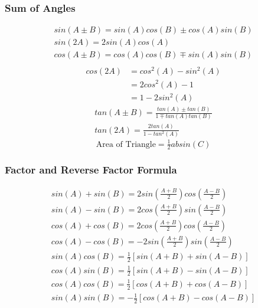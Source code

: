 \documentclass[../main]{subfiles}
\begin{document}
	\subsubsection{Sum of Angles}
	\begin{equation*} \begin{gathered}
		sin(A \pm B) = sin(A)cos(B) \pm cos(A)sin(B) \\
		sin(2A) = 2sin(A)cos(A) \\
		cos(A \pm B) = cos(A)cos(B) \mp sin(A)sin(B) \\
	\end{gathered} \end{equation*}
	\begin{equation*} \begin{split}
		cos(2A) & = cos^2(A) - sin^2(A) \\
				& = 2cos^2(A) - 1 \\
				& = 1 - 2sin^2(A)
	\end{split} \end{equation*}
	\begin{equation*} \begin{gathered}
		tan(A \pm B) = \frac{tan(A) \pm tan(B)}{1 \mp tan(A)tan(B)} \\
		tan(2A) = \frac{2tan(A)}{1-tan^2(A)} 
	\end{gathered} \end{equation*}
	\[ \text{Area of Triangle} = \tfrac{1}{2}absin(C) \]
	\subsubsection{Factor and Reverse Factor Formula}
	\begin{equation*} \begin{gathered}
		sin(A)+sin(B) = 2sin(\tfrac{A+B}{2})cos(\tfrac{A-B}{2}) \\
		sin(A)-sin(B) = 2cos(\tfrac{A+B}{2})sin(\tfrac{A-B}{2}) \\
		cos(A)+cos(B) = 2cos(\tfrac{A+B}{2})cos(\tfrac{A-B}{2}) \\
		cos(A)-cos(B) = -2sin(\tfrac{A+B}{2})sin(\tfrac{A-B}{2}) \\
		sin(A)cos(B) = \tfrac{1}{2} [ sin(A+B) + sin(A-B) ] \\
		cos(A)sin(B) = \tfrac{1}{2} [ sin(A+B) - sin(A-B) ] \\ 
		cos(A)cos(B) = \tfrac{1}{2} [ cos(A+B) + cos(A-B) ] \\
		sin(A)sin(B) = -\tfrac{1}{2} [ cos(A+B) - cos(A-B) ]
	\end{gathered} \end{equation*}
\end{document}
